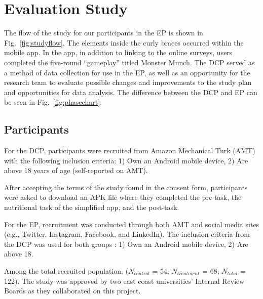 \section{Evaluation Study}

The flow of the study for our participants in the EP is shown in Fig.~\ref{fig:studyflow}. 
The elements inside the curly braces occurred within the mobile app. 
In the app, in addition to linking to the online surveys, users completed the five-round ``gameplay'' titled Monster Munch. The DCP served as a method of data collection for use in the EP, as well as an opportunity for the research team to evaluate possible changes and improvements to the study plan and opportunities for data analysis. The difference between the DCP and EP can be seen in Fig.~\ref{fig:phasechart}.

\subsection{Participants}

For the DCP, participants were recruited from Amazon Mechanical Turk (AMT) with the following inclusion criteria: 1) Own an Android mobile device, 2) Are above 18 years of age (self-reported on AMT).

After accepting the terms of the study found in the consent form, participants were asked to download an APK file where they completed the pre-task, the nutritional task of the simplified app, and the post-task. 

For the EP, recruitment was conducted through both AMT and social media sites (e.g., Twitter, Instagram, Facebook, and LinkedIn).
The inclusion criteria from the DCP was used for both groups : 1) Own an Android mobile device, 2) Are above 18. 


Among the total recruited population,
(\textit{$N_{control}$} = 54, \textit{$N_{treatment}$} = 68; \textit{$N_{total}$} = 122). The study was approved by two east coast universities' Internal Review Boards as they collaborated on this project.

